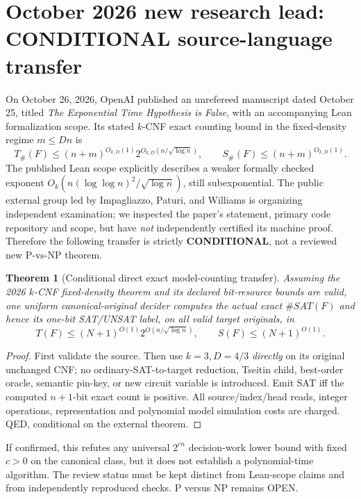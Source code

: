 \documentclass[11pt]{article}
\newtheorem{theorem}{Theorem}
\begin{document}
\section{October 2026 new research lead: CONDITIONAL source-language transfer}
On October 26, 2026, OpenAI published an unrefereed manuscript dated October 25, titled \emph{The Exponential Time Hypothesis is False}, with an accompanying Lean formalization scope. Its stated $k$-CNF exact counting bound in the fixed-density regime $m\le Dn$ is
\[
T_{\#}(F)\le (n+m)^{O_{k,D}(1)}
2^{O_{k,D}(n/\sqrt{\log n})},\qquad
S_{\#}(F)\le(n+m)^{O_{k,D}(1)}.
\]
The published Lean scope explicitly describes a weaker formally checked exponent $O_k(n(\log\log n)^2/\sqrt{\log n})$, still subexponential. The public external group led by Impagliazzo, Paturi, and Williams is organizing independent examination; we inspected the paper's statement, primary code repository and scope, but have \emph{not} independently certified its machine proof. Therefore the following transfer is strictly \textbf{CONDITIONAL}, not a reviewed new P-vs-NP theorem.
\begin{theorem}[Conditional direct exact model-counting transfer]
Assuming the 2026 $k$-CNF fixed-density theorem and its declared bit-resource bounds are valid, one uniform canonical-original decider computes the actual exact $\#SAT(F)$ and hence its one-bit SAT/UNSAT label, on all valid target originals, in
\[
T(F)\le(N+1)^{O(1)}2^{O(n/\sqrt{\log n})},
\qquad S(F)\le(N+1)^{O(1)}.
\]
\end{theorem}
\begin{proof}
First validate the source. Then use $k=3,D=4/3$ \emph{directly} on its original unchanged CNF; no ordinary-SAT-to-target reduction, Tseitin child, best-order oracle, semantic pin-key, or new circuit variable is introduced. Emit SAT iff the computed $n+1$-bit exact count is positive. All source/index/head reads, integer operations, representation and polynomial model simulation costs are charged. QED, conditional on the external theorem.
\end{proof}
If confirmed, this refutes any universal $2^{cn}$ decision-work lower bound with fixed $c>0$ on the canonical class, but it does not establish a polynomial-time algorithm. The review status must be kept distinct from Lean-scope claims and from independently reproduced checks. P versus NP remains OPEN.
\end{document}
